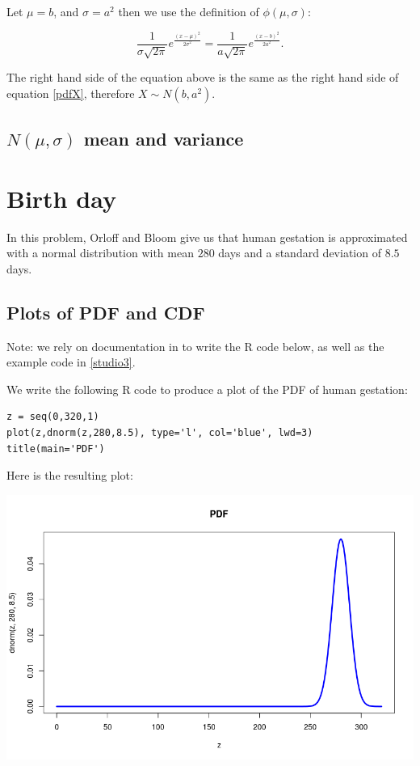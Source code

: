 \documentclass[a4paper,11pt]{article}
\begin{document}
Let $\mu=b$, and $\sigma=a^2$ then we use the definition of
$\phi \left( \mu, \sigma \right)$:

\begin{equation}
\frac{1}{\sigma \sqrt{2 \pi }} e^{\frac{ \left( x - \mu \right)^{2}} {2 \sigma^{2}}}
= \frac{1}{a \sqrt{2 \pi }} e^{\frac{ \left( x - b \right)^{2}} {2 a^{2}}}.
\end{equation}

The right hand side of the equation above is the same as the right hand side of
equation \ref{pdfX}, therefore $X \sim N \left( b, a^2 \right)$.

\subsection{$N \left( \mu, \sigma \right)$ mean and variance}

\section{Birth day}

In this problem, Orloff and Bloom give us that human gestation is approximated
with a normal distribution with mean $280$ days and a standard deviation of
$8.5$ days.

\subsection{Plots of PDF and CDF }

Note: we rely on documentation in \cite{plotTitle} to write the R code
below, as well as the example code in \ref{studio3}.

We write the following R code to produce a plot of the PDF of human gestation:

\begin{lstlisting}
z = seq(0,320,1)
plot(z,dnorm(z,280,8.5), type='l', col='blue', lwd=3)
title(main='PDF')
\end{lstlisting}

Here is the resulting plot:
\begin{center}
\includegraphics[scale=0.5]{pdf-gestation}
\end{center}
\end{document}
